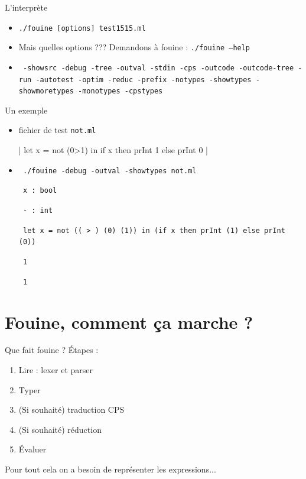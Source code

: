 \documentclass{beamer}
\newcommand{\tocpage}{
  \begin{frame}
    \tableofcontents[currentsection]
  \end{frame}
}
\begin{document}
\begin{frame}{L'interprète}
  \begin{itemize}

  \item<1-> \texttt{./fouine [options] test1515.ml}

  \item<2->  Mais quelles options ??? Demandons à fouine : \texttt{./fouine --help}

  \item<3->  \texttt{
      -showsrc -debug -tree -outval -stdin -cps -outcode -outcode-tree -run -autotest -optim -reduc -prefix -notypes -showtypes -showmoretypes -monotypes -cpstypes
    }

  \end{itemize}
\end{frame}


\begin{frame}{Un exemple}
  \begin{itemize}
  \item fichier de test \texttt{not.ml}

  |
  let x = not (0>1) in if x then prInt 1 else prInt 0
  |

 \item
\texttt{ ./fouine -debug -outval -showtypes not.ml }

\texttt{ x : bool }

\texttt{ - : int }

\texttt{ let x = not (( > ) (0) (1)) in (if x then prInt (1) else prInt (0)) }

\texttt{ 1 }
 
\texttt{ 1 }


\end{itemize}
\end{frame}

\section{Fouine, comment ça marche ?}

\tocpage

\begin{frame}{Que fait fouine ?}
  Étapes :
  \begin{enumerate}
  \item Lire : lexer et parser
  \item Typer
  \item (Si souhaité) traduction CPS
  \item (Si souhaité) réduction
  \item Évaluer
  \end{enumerate}

  Pour tout cela on a besoin de représenter les expressions...
\end{frame}
\end{document}
